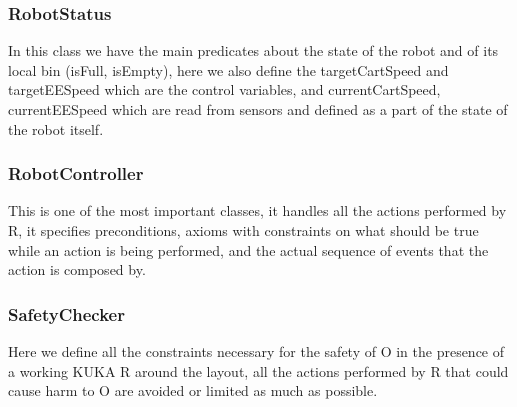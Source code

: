 \documentclass[a4paper]{article}
\begin{document}
\subsubsection{RobotStatus}
In this class we have the main predicates about the state of the robot and of its local bin (isFull, isEmpty), here we also define the targetCartSpeed and targetEESpeed which are the control variables, and currentCartSpeed, currentEESpeed which are read from sensors and defined as a part of the state of the robot itself.

\subsubsection{RobotController}
This is one of the most important classes, it handles all the actions performed by R, it specifies preconditions, axioms with constraints on what should be true while an action is being performed, and the actual sequence of events that the action is composed by.

\subsubsection{SafetyChecker}
Here we define all the constraints necessary for the safety of O in the presence of a working KUKA R around the layout, all the actions performed by R that could cause harm to O are avoided or limited as much as possible.
\end{document}
